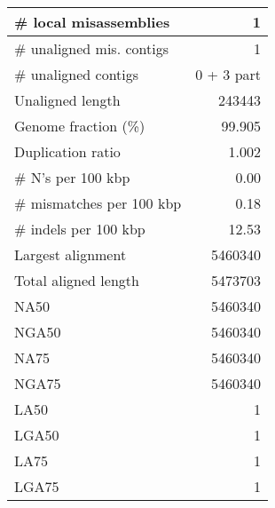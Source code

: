 \documentclass[12pt,a4paper]{article}
\begin{document}
\begin{table}[ht]
\begin{center}
\begin{tabular}{|l*{1}{|r}|}
\# local misassemblies & 1 \\ \hline
\# unaligned mis. contigs & 1 \\ \hline
\# unaligned contigs & 0 + 3 part \\ \hline
Unaligned length & 243443 \\ \hline
Genome fraction (\%) & 99.905 \\ \hline
Duplication ratio & 1.002 \\ \hline
\# N's per 100 kbp & 0.00 \\ \hline
\# mismatches per 100 kbp & 0.18 \\ \hline
\# indels per 100 kbp & 12.53 \\ \hline
Largest alignment & 5460340 \\ \hline
Total aligned length & 5473703 \\ \hline
NA50 & 5460340 \\ \hline
NGA50 & 5460340 \\ \hline
NA75 & 5460340 \\ \hline
NGA75 & 5460340 \\ \hline
LA50 & 1 \\ \hline
LGA50 & 1 \\ \hline
LA75 & 1 \\ \hline
LGA75 & 1 \\ \hline
\end{tabular}
\end{center}
\end{table}
\end{document}
